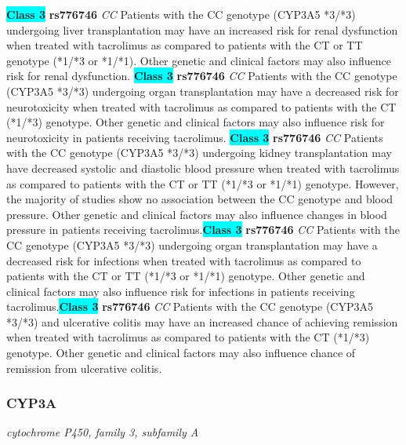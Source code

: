 \documentclass{report}
\begin{document}
\textbf{\colorbox{cyan} {Class 3}} \textbf{ rs776746 } \textit{ CC }
Patients with the CC genotype (CYP3A5 *3/*3) undergoing liver transplantation may have an increased risk for renal dysfunction when treated with tacrolimus as compared to patients with the CT or TT genotype (*1/*3 or *1/*1). Other genetic and clinical factors may also influence risk for renal dysfunction. \newline\textbf{\colorbox{cyan} {Class 3}} \textbf{ rs776746 } \textit{ CC }
Patients with the CC genotype (CYP3A5 *3/*3) undergoing organ transplantation may have a decreased risk for neurotoxicity when treated with tacrolimus as compared to patients with the CT (*1/*3) genotype. Other genetic and clinical factors may also influence risk for neurotoxicity in patients receiving tacrolimus. \newline\textbf{\colorbox{cyan} {Class 3}} \textbf{ rs776746 } \textit{ CC }
Patients with the CC genotype (CYP3A5 *3/*3) undergoing kidney transplantation may have decreased systolic and diastolic blood pressure when treated with tacrolimus as compared to patients with the CT or TT (*1/*3 or *1/*1) genotype. However, the majority of studies show no association between the CC genotype and blood pressure. Other genetic and clinical factors may also influence changes in blood pressure in patients receiving tacrolimus.\newline\textbf{\colorbox{cyan} {Class 3}} \textbf{ rs776746 } \textit{ CC }
Patients with the CC genotype (CYP3A5 *3/*3) undergoing organ transplantation may have a decreased risk for infections when treated with tacrolimus as compared to patients with the CT or TT (*1/*3 or *1/*1) genotype. Other genetic and clinical factors may also influence risk for infections in patients receiving tacrolimus.\newline\textbf{\colorbox{cyan} {Class 3}} \textbf{ rs776746 } \textit{ CC }
Patients with the CC genotype (CYP3A5 *3/*3) and ulcerative colitis may have an increased chance of achieving remission when treated with tacrolimus as compared to patients with the CT (*1/*3) genotype. Other genetic and clinical factors may also influence chance of remission from ulcerative colitis. \newline\subsubsection{ CYP3A }
\textit{ cytochrome P450, family 3, subfamily A }
\end{document}
